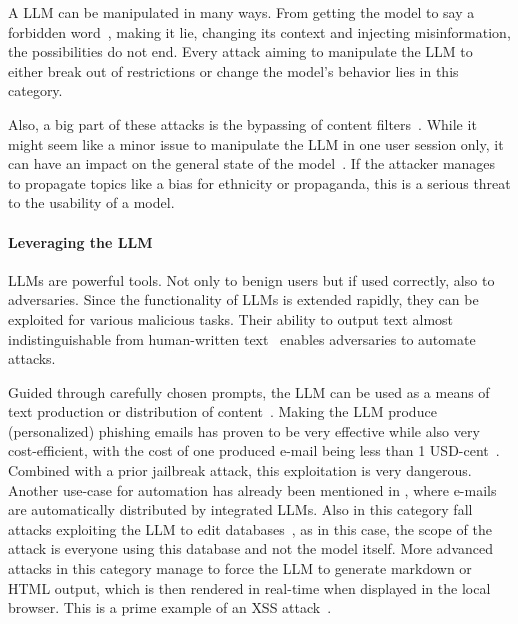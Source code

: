 A LLM can be manipulated in many ways. 
From getting the model to say a forbidden word~\cite{wei2023jailbroken, chao2023jailbreaking}, making it lie, changing its context and injecting misinformation\cite{10.1145/3605764.3623985}, the possibilities do not end. 
Every attack aiming to manipulate the LLM to either break out of restrictions or change the model's behavior lies in this category. 

Also, a big part of these attacks is the bypassing of content filters~\cite{chao2023jailbreaking}.
While it might seem like a minor issue to manipulate the LLM in one user session only, it can have an impact on the general state of the model~\cite{pedro2023prompt}. 
If the attacker manages to propagate topics like a bias for ethnicity or propaganda, this is a serious threat to the usability of a model.
\paragraph{Leveraging the LLM}
LLMs are powerful tools. 
Not only to benign users but if used correctly, also to adversaries.
Since the functionality of LLMs is extended rapidly, they can be exploited for various malicious tasks.
Their ability to output text almost indistinguishable from human-written text~\cite{sadasivan2023can} enables adversaries to automate attacks.

Guided through carefully chosen prompts, the LLM can be used as a means of text production or distribution of content~\cite{10.1145/3605764.3623985}. 
Making the LLM produce (personalized) phishing emails has proven to be very effective while also very cost-efficient, with the cost of one produced e-mail being less than 1 USD-cent~\cite{hazell2023spear}.
Combined with a prior jailbreak attack, this exploitation is very dangerous.
Another use-case for automation has already been mentioned in , where e-mails are automatically distributed by integrated LLMs.
Also in this category fall attacks exploiting the LLM to edit databases~\cite{pedro2023prompt}, as in this case, the scope of the attack is everyone using this database and not the model itself.
More advanced attacks in this category manage to force the LLM to generate markdown or HTML output, which is then rendered in real-time when displayed in the local browser.
This is a prime example of an XSS attack~\cite{HYDARA2015170}.